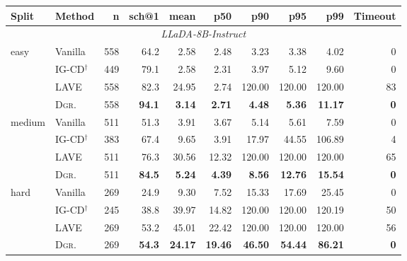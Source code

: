 \documentclass[11pt]{article}
\begin{document}
\begin{table}[t]
\small
\centering
\setlength{\tabcolsep}{4pt}
\begin{tabular}{llrrrrrrrr}
\toprule
\textbf{Split} & \textbf{Method} & \textbf{n} & \textbf{sch@1} & \textbf{mean} & \textbf{p50} & \textbf{p90} & \textbf{p95} & \textbf{p99} & \textbf{Timeout} \\
\midrule
\multicolumn{10}{c}{\textit{LLaDA-8B-Instruct}} \\
\midrule
easy   & Vanilla       & 558 & 64.2          & 2.58          & 2.48          & 3.23           & 3.38           & 4.02            & 0 \\
       & IG-CD$^\dagger$ & 449 & 79.1        & 2.58          & 2.31          & 3.97           & 5.12           & 9.60            & 0 \\
       & LAVE          & 558 & 82.3          & 24.95         & 2.74          & 120.00         & 120.00         & 120.00          & 83 \\
       & \textsc{Dgr.} & 558 & \textbf{94.1} & \textbf{3.14} & \textbf{2.71}  & \textbf{4.48}  & \textbf{5.36}  & \textbf{11.17}  & \textbf{0} \\
\cmidrule(lr){1-10}
medium & Vanilla       & 511 & 51.3          & 3.91          & 3.67          & 5.14           & 5.61           & 7.59            & 0 \\
       & IG-CD$^\dagger$ & 383 & 67.4        & 9.65          & 3.91          & 17.97          & 44.55          & 106.89          & 4 \\
       & LAVE          & 511 & 76.3          & 30.56         & 12.32         & 120.00         & 120.00         & 120.00          & 65 \\
       & \textsc{Dgr.} & 511 & \textbf{84.5} & \textbf{5.24} & \textbf{4.39}  & \textbf{8.56}  & \textbf{12.76} & \textbf{15.54}  & \textbf{0} \\
\cmidrule(lr){1-10}
hard   & Vanilla       & 269 & 24.9          & 9.30          & 7.52          & 15.33          & 17.69          & 25.45           & 0 \\
       & IG-CD$^\dagger$ & 245 & 38.8        & 39.97         & 14.82         & 120.00         & 120.00         & 120.19          & 50 \\
       & LAVE          & 269 & 53.2          & 45.01         & 22.42         & 120.00         & 120.00         & 120.00          & 56 \\
       & \textsc{Dgr.} & 269 & \textbf{54.3} & \textbf{24.17}& \textbf{19.46} & \textbf{46.50} & \textbf{54.44} & \textbf{86.21}  & \textbf{0} \\

\end{tabular}
\end{table}
\end{document}
